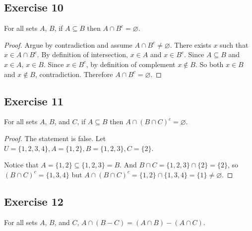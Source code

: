 \documentclass[14pt]{extarticle}
\newcommand{\es}{\varnothing}
\begin{document}
\subsection{Exercise 10}
For all sets $A$, $B$, if \(A \subseteq B\) then \(A \cap B^c = \es\).

\begin{proof}
Argue by contradiction and assume \(A \cap B^c \neq \es\).
There exists $x$ such that \(x \in A \cap B^c \). By definition of intersection, $x \in A$ and $x \in B^c$.
Since \(A \subseteq B\) and \(x \in A\), \(x \in B\). Since $x \in B^c$, by definition of complement \(x \notin B\).
So both \(x \in B\) and \(x \notin B\), contradiction.
Therefore \(A \cap B^c = \es\).
\end{proof}

\subsection{Exercise 11}
For all sets $A$, $B$, and $C$, if \(A \subseteq B\) then \(A \cap (B \cap C)^c = \es\).

\begin{proof}
The statement is false. Let \(U = \{1, 2, 3, 4\}, A = \{1, 2\}, B = \{1, 2, 3\}, C = \{2\}\).

Notice that \(A = \{1, 2\} \subseteq \{1, 2, 3\} = B\). And \(B \cap C = \{1, 2, 3\} \cap \{2\} = \{2\}\), so 
\((B \cap C)^c = \{1, 3, 4\}\) but \(A \cap (B \cap C)^c = \{1, 2\} \cap \{1, 3, 4\} = \{1\} \neq \es\).
\end{proof}

\subsection{Exercise 12}
For all sets $A$, $B$, and $C$, \(A \cap (B - C) = (A \cap B) - (A \cap C)\).
\end{document}

